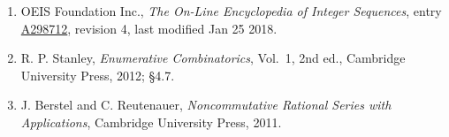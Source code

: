 \documentclass[11pt]{article}
\theoremstyle{definition}
\begin{document}
\begin{enumerate}

\item OEIS Foundation Inc., \emph{The On-Line Encyclopedia of Integer Sequences}, entry \href{https://oeis.org/A298712}{A298712}, revision 4, last modified Jan 25 2018.

\item R. P. Stanley, \emph{Enumerative Combinatorics}, Vol.~1, 2nd ed., Cambridge University Press, 2012; \S4.7.

\item J. Berstel and C. Reutenauer, \emph{Noncommutative Rational Series with Applications}, Cambridge University Press, 2011.

\end{enumerate}
\end{document}
